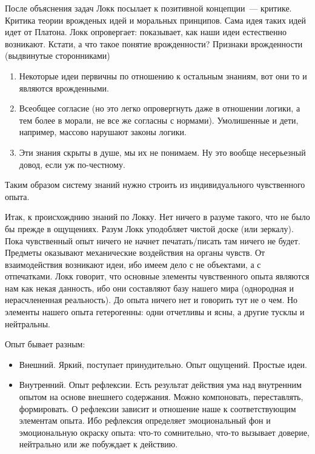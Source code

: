 После объяснения задач Локк посылает к позитивной концепции~--- критике. Критика теории врожденых идей и моральных принципов. Сама идея таких идей идет от Платона. Локк опровергает: показывает, как наши идеи естественно возникают. Кстати, а что такое понятие врожденности? Признаки врожденности (выдвинутые сторонниками)
\begin{enumerate}
	\item Некоторые идеи первичны по отношению к остальным знаниям, вот они то и являются врожденными.
	\item Всеобщее согласие (но это легко опровергнуть даже в отношении логики, а тем более в морали, не все же согласны с нормами). Умолишенные и дети, например, массово нарушают законы логики.
	\item Эти знания скрыты в душе, мы их не понимаем. Ну это вообще несерьезный довод, если уж по-честному.
\end{enumerate}
	
Таким образом систему знаний нужно строить из индивидуального чувственного опыта.

Итак, к происхожднию знаний по Локку. 
Нет ничего в разуме такого, что не было бы прежде в ощущениях. Разум Локк уподобляет чистой доске (или зеркалу). Пока чувственный опыт ничего не начнет печатать/писать там ничего не будет. Предметы оказывают механические воздействия на органы чувств. От взаимодействия возникают идеи, ибо имеем дело с не объектами, а с отпечатками. Локк говорит, что основные элементы чувственного опыта являются нам как некая данность, ибо они составляют базу нашего мира (однородная и нерасчлененная реальность). До опыта ничего нет и говорить тут не о чем. Но элементы нашего опыта гетерогенны: одни отчетливы и ясны, а другие тусклы и нейтральны.

Опыт бывает разным:
\begin{itemize}
	\item Внешний. Яркий, поступает принудительно. Опыт ощущений. Простые идеи.
	\item Внутренний. Опыт рефлексии. Есть результат действия ума над внутренним опытом на основе внешнего содержания. Можно компоновать, переставлять, формировать. О  рефлексии зависит и отношение наше к соответствующим элементам опыта. Ибо рефлексия определяет эмоциональный фон и эмоциональную окраску опыта: что-то сомнительно, что-то вызывает доверие, нейтрально или же побуждает к действию.
\end{itemize}
	

